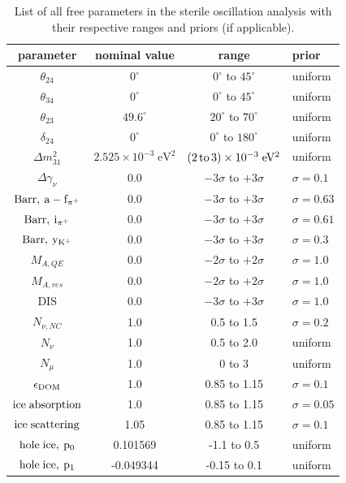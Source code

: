 \begin{table}
    \centering
    \begin{tabular}{cccl}\toprule
        \textbf{parameter} & \textbf{nominal value} & \textbf{range} & \textbf{prior} \\
        \midrule
        $\theta_{24}$ &    $0^\circ$ &  $0^\circ$ to $45^\circ$  & uniform \\
        $\theta_{34}$ &    $0^\circ$ &  $0^\circ$ to $45^\circ$  & uniform \\
        $\theta_{23}$ & $49.6^\circ$ & $20^\circ$ to $70^\circ$  & uniform \\
        $\delta_{24}$ &    $0^\circ$ &  $0^\circ$ to $180^\circ$ & uniform \\
        $\Delta m^2_{31}$ & $2.525\times10^{-3}\;\mathrm{eV^2}$ & $(2\,\rm{to}\, 3)\times10^{-3}\;\mathrm{eV^2}$ & uniform \\
        \midrule
        $\Delta \gamma_\nu$ & 0.0 & $-3\sigma$ to $+3\sigma$ &  $\sigma=0.1$  \\
        $\rm{Barr}, \: a-f_{\pi^+}$ & 0.0 & $-3\sigma$ to $+3\sigma$ &  $\sigma=0.63$  \\
        $\rm{Barr}, \: i_{\pi^+}$ & 0.0 & $-3\sigma$ to $+3\sigma$ &  $\sigma=0.61$  \\
        $\rm{Barr}, \: y_{K^+}$ & 0.0 & $-3\sigma$ to $+3\sigma$ &  $\sigma=0.3$  \\
        \midrule
        $M_{A,QE}$ & 0.0 & $-2\sigma$ to $+2\sigma$ &  $\sigma=1.0$  \\
        $M_{A,res}$ & 0.0 & $-2\sigma$ to $+2\sigma$ &  $\sigma=1.0$  \\
        DIS & 0.0 & $-3\sigma$ to $+3\sigma$ &  $\sigma=1.0$  \\
        $N_{\nu, NC}$ & 1.0 & 0.5 to 1.5 &  $\sigma=0.2$  \\
        \midrule
        $N_{\nu}$ & 1.0 & 0.5 to 2.0 & uniform \\
        $N_{\mu}$ & 1.0 & 0 to 3 & uniform \\
        \midrule
        $\epsilon_{\rm{DOM}}$ & 1.0 & 0.85 to 1.15 & $\sigma=0.1$ \\
        $\rm{ice \; absorption}$ & 1.0 & 0.85 to 1.15 & $\sigma=0.05$ \\
        $\rm{ice \; scattering}$ & 1.05 & 0.85 to 1.15 & $\sigma=0.1$ \\
        $\rm{hole \; ice}, \: p_0$ & 0.101569 & -1.1 to 0.5 & uniform \\
        $\rm{hole \; ice}, \: p_1$ & -0.049344 & -0.15 to 0.1 & uniform \\
        \bottomrule
    \end{tabular}
    \caption{List of all free parameters in the sterile oscillation analysis with their respective ranges and priors (if applicable).}
    \label{tab:all-parameters}
\end{table}

